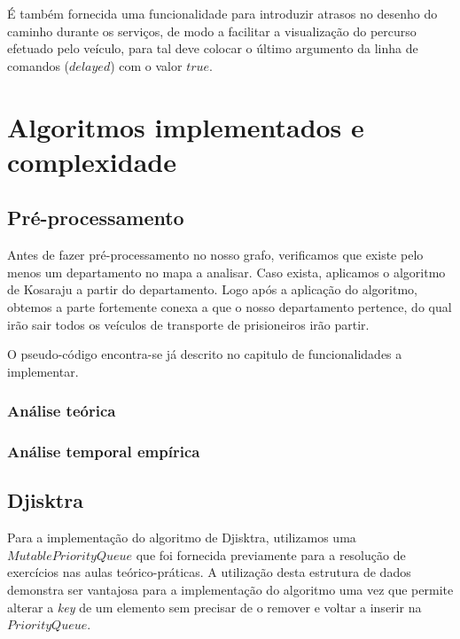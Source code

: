 \documentclass[article, a4paper, 12pt, oneside]{memoir}
\begin{document}
É também fornecida uma funcionalidade para introduzir atrasos no desenho do caminho durante os serviços, de modo a facilitar a visualização do percurso efetuado pelo veículo, para tal deve colocar o último argumento da linha de comandos ($delayed$) com o valor $true$.


\newpage
\chapter[Algoritmos implementados e complexidade][Algoritmos implementados e complexidade]{Algoritmos implementados e complexidade} \label{\thechapter}

\section{Pré-processamento}
Antes de fazer pré-processamento no nosso grafo, verificamos que existe pelo menos um departamento no mapa a analisar.
Caso exista, aplicamos o algoritmo de Kosaraju a partir do departamento. Logo após a aplicação do algoritmo, 
obtemos a parte fortemente conexa a que o nosso departamento pertence, do qual irão sair todos os veículos de transporte de prisioneiros irão partir.

O pseudo-código encontra-se já descrito no capitulo de funcionalidades a implementar.
\subsection{Análise teórica}


\subsection{Análise temporal empírica}

\section{Djisktra}
Para a implementação do algoritmo de Djisktra, utilizamos uma $MutablePriorityQueue$ que foi fornecida previamente para a resolução de exercícios nas aulas teórico-práticas.
A utilização desta estrutura de dados demonstra ser vantajosa para a implementação do algoritmo uma vez que permite
alterar a \textit{key} de um elemento sem precisar de o remover e voltar a inserir na $PriorityQueue$.
\end{document}
